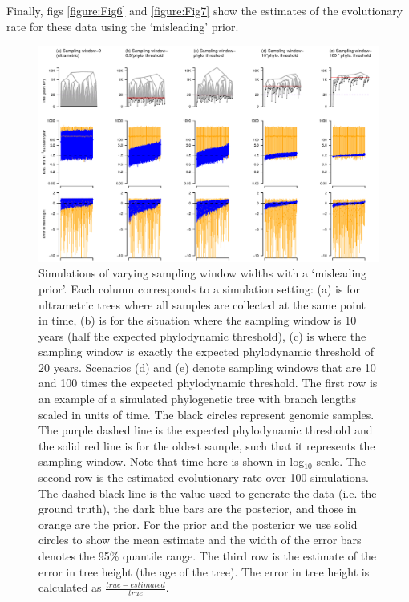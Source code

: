 \documentclass[11pt]{article}
\begin{document}
Finally, figs \ref{figure:Fig6} and \ref{figure:Fig7} show the estimates of the evolutionary rate for these data using the `misleading' prior.

\begin{landscape}
	\begin{figure}[H]
		\begin{center}
			\includegraphics[scale=0.7, angle=0]{summary_all_estimates_misleading_upwards_prior.pdf}
			\caption{Simulations of varying sampling window widths with a `misleading prior'. Each column corresponds to a simulation setting: (a) is for ultrametric trees where all samples are collected at the same point in time, (b) is for the situation where the sampling window is 10 years (half the expected phylodynamic threshold), (c) is where the sampling window is exactly the expected phylodynamic threshold of 20 years. Scenarios (d) and (e) denote sampling windows that are 10 and 100 times the expected phylodynamic threshold. The first row is an example of a simulated phylogenetic tree with branch lengths scaled in units of time. The black circles represent genomic samples. The purple dashed line is the expected phylodynamic threshold and the solid red line is for the oldest sample, such that it represents the sampling window. Note that time here is shown in log$_{10}$ scale. The second row is the estimated evolutionary rate over 100 simulations. The dashed black line is the value used to generate the data (i.e. the ground truth), the dark blue bars are the posterior, and those in orange are the prior. For the prior and the posterior we use solid circles to show the mean estimate and the width of the error bars denotes the 95\% quantile range. The third row is the estimate of the error in tree height (the age of the tree). The error in tree height is calculated as $\frac{true-estimated}{true}$.}
			\label{figure:Fig1}
		\end{center}
	\end{figure}
\end{landscape}
\end{document}
